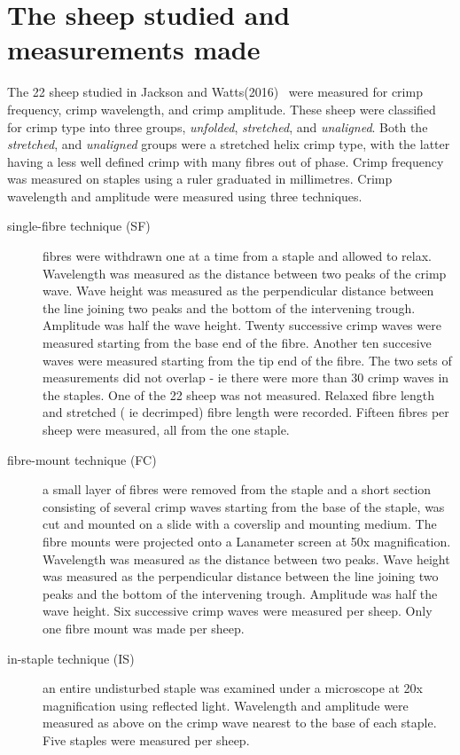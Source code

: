 \documentclass[titlepage,10pt]{article}  %
\begin{document}
\section{The sheep studied and measurements made}
 The 22 sheep studied in Jackson and Watts(2016)~\cite{jack:16} were measured for crimp frequency, crimp wavelength, and crimp amplitude.  These sheep were classified for crimp type into three groups, {\em unfolded}, {\em stretched}, and {\em unaligned}. Both the {\em stretched}, and {\em unaligned} groups were a stretched helix crimp type, with the latter having a less well defined crimp with many fibres out of phase. Crimp frequency was measured on staples using a ruler graduated in millimetres. Crimp wavelength and amplitude were measured using three techniques.
\begin{description}
\item[single-fibre technique (SF)] fibres were withdrawn one at a time from a staple and allowed to relax. Wavelength was measured as the distance between two peaks of the crimp wave. Wave height was measured as the perpendicular distance between the line joining two peaks and the bottom of the intervening trough. Amplitude was half the wave height. Twenty successive crimp waves were measured starting from the base end of the fibre. Another ten succesive waves were measured starting from the tip end of the fibre. The two sets of measurements did not overlap - ie there were more than 30 crimp waves in the staples. One of the 22 sheep was not measured. Relaxed fibre length and stretched ( ie decrimped) fibre length were recorded. Fifteen fibres per sheep were measured, all from the one staple.
\item[fibre-mount technique (FC)] a small layer of fibres were removed from the staple  and a short section consisting of several crimp waves starting from the base of the staple, was cut and mounted on a slide with a coverslip and mounting medium. The fibre mounts were projected onto a Lanameter screen at 50x magnification. Wavelength was measured as the distance between two peaks. Wave height was measured as the perpendicular distance between the line joining two peaks and the bottom of the intervening trough. Amplitude was half the wave height. Six successive crimp waves were measured per sheep. Only one fibre mount was made per sheep.
\item[in-staple technique (IS)] an entire undisturbed staple was examined under a microscope at 20x magnification using reflected light. Wavelength and amplitude were measured as above on the crimp wave nearest to the base of each staple. Five staples were measured per sheep.
\end{description}
\end{document}
